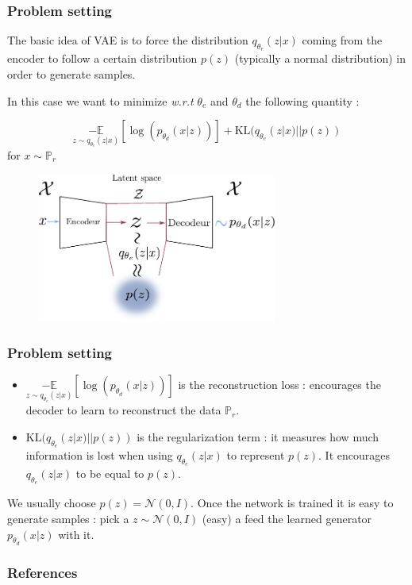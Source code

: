 \documentclass[french,9pt]{beamer}
\begin{document}
\begin{frame}
\frametitle{Problem setting}

The basic idea of VAE is to force the distribution $q_{\theta_{e}}(z|x)$ coming from the encoder to follow a certain distribution $p(z)$ (typically a normal distribution) in order to generate samples.

In this case we want to minimize \textit{w.r.t} $\theta_{e}$ and $\theta_{d}$ the following quantity  :

\begin{equation}
\label{vaeeq}
 \underset{}{} \underset{z \sim q_{\theta_{e}}(z|x)}{-\mathbb{E}}[\log(p_{\theta_{d}}(x|z))] + \text{KL}(q_{\theta_{e}}(z|x) || p(z))
\end{equation}
for  $x \sim \mathbb{P}_{r}$

\begin{figure}
  \begin{center}
    \includegraphics[width=0.7\textwidth]{fig/vae.pdf}
  \end{center}
\end{figure}

\end{frame}


\begin{frame}
\frametitle{Problem setting}


\begin{itemize}
\item $\underset{z \sim q_{\theta_{e}}(z|x)}{-\mathbb{E}}[\log(p_{\theta_{d}}(x|z))]$ is the reconstruction loss : encourages the decoder to learn to reconstruct the data $\mathbb{P}_{r}$.
\item $\text{KL}(q_{\theta_{e}}(z|x) || p(z))$ is the regularization term : it measures how much information is lost when using $q_{\theta_{e}}(z|x)$ to represent $p(z)$. It encourages $q_{\theta_{e}}(z|x)$ to be equal to $p(z)$.
\end{itemize}

We usually choose $p(z)=\mathcal{N}(0,I)$. Once the network is trained it is easy to generate samples : pick a $z\sim \mathcal{N}(0,I)$ (easy) a feed the learned generator $p_{\theta_{d}}(x|z)$ with it.

\end{frame}

\begin{frame}[allowframebreaks]
        \frametitle{References}
        
        
\end{frame}
\end{document}
